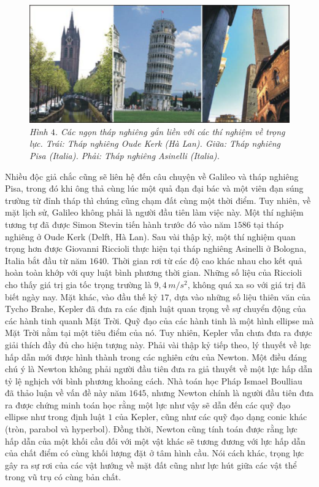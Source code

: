\begin{multicols}{2}
	\begin{figure}[H]
		\vspace*{-5pt}
		\centering
		\captionsetup{labelformat= empty, justification=centering}
		\includegraphics[width =1\linewidth]{4}
		\caption{\small\textit{\color{timhieukhoahoc}Hình $4$. Các ngọn tháp nghiêng gắn liền với các thí nghiệm về trọng lực. Trái: Tháp nghiêng Oude Kerk (Hà Lan). Giữa: Tháp nghiêng Pisa (Italia). Phải: Tháp nghiêng Asinelli (Italia).}}
		\vspace*{-10pt}
	\end{figure}
	Nhiều độc giả chắc cũng sẽ liên hệ đến câu chuyện về Galileo và tháp nghiêng Pisa, trong đó khi ông thả cùng lúc một quả đạn đại bác và một viên đạn súng trường từ đỉnh tháp thì chúng cũng chạm đất cùng một thời điểm. Tuy nhiên, về mặt lịch sử, Galileo không phải là người đầu tiên làm việc này. Một thí nghiệm tương tự đã được Simon Stevin tiến hành trước đó vào năm $1586$ tại tháp nghiêng ở Oude Kerk (Delft, Hà Lan). Sau vài thập kỷ, một thí nghiệm quan trọng hơn được Giovanni Riccioli thực hiện tại tháp nghiêng Asinelli ở Bologna, Italia bắt đầu từ năm $1640$. Thời gian rơi từ các độ cao khác nhau cho kết quả hoàn toàn khớp với quy luật bình phương thời gian. Những số liệu của Riccioli cho thấy giá trị gia tốc trọng trường là $9{,}4 \,m/s^2$, không quá xa so với giá trị đã biết ngày nay. 
	\vskip 0.1cm
	Mặt khác, vào đầu thế kỷ $17$, dựa vào những số liệu thiên văn của Tycho Brahe, Kepler đã đưa ra các định luật quan trọng về sự chuyển động của các hành tinh quanh Mặt Trời. Quỹ đạo của các hành tinh là một hình ellipse mà Mặt Trời nằm tại một tiêu điểm của nó. Tuy nhiên, Kepler vẫn chưa đưa ra được giải thích đầy đủ cho hiện tượng này. Phải vài thập kỷ tiếp theo, lý thuyết về lực hấp dẫn mới được hình thành trong các nghiên cứu của Newton. Một điều đáng chú ý là Newton không phải người đầu tiên đưa ra giả thuyết về một lực hấp dẫn tỷ lệ nghịch với bình phương khoảng cách. Nhà toán học Pháp Ismael Boulliau đã thảo luận về vấn đề này năm $1645$, nhưng Newton chính là người đầu tiên đưa ra được chứng minh toán học rằng một lực như vậy sẽ dẫn đến các quỹ đạo ellipse như trong định luật $1$ của Kepler, cũng như các quỹ đạo dạng conic khác (tròn, parabol và hyperbol). Đồng thời, Newton cũng tính toán được rằng lực hấp dẫn của một khối cầu đối với một vật khác sẽ tương đương với lực hấp dẫn của chất điểm có cùng khối lượng đặt ở tâm hình cầu. Nói cách khác, trọng lực gây ra sự rơi của các vật hướng về mặt đất cũng như lực hút giữa các vật thể trong vũ trụ có cùng bản chất.

\end{multicols}
